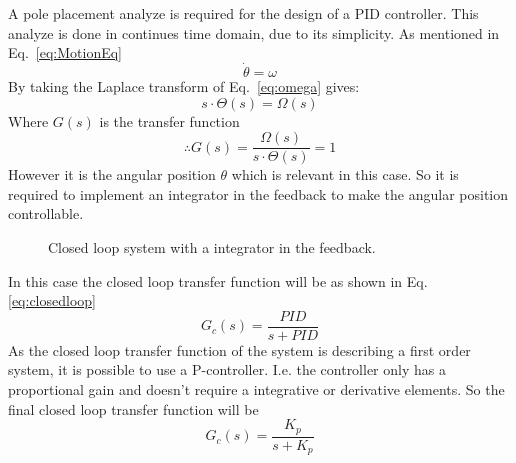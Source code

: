 A pole placement analyze is required for the design of a PID controller.
This analyze is done in continues time domain, due to its simplicity.
As mentioned in Eq.~\eqref{eq:MotionEq}
\begin{equation}
\dot{\theta} = \omega
\label{eq:omega}
\end{equation}
By taking the Laplace transform of Eq.~\eqref{eq:omega} gives:
\begin{equation}
s\cdot \Theta(s)= \Omega(s)
\end{equation}
Where $G(s)$ is the transfer function
\begin{equation}
\therefore G(s)=\frac{\Omega(s)}{s\cdot\Theta(s)} = 1
\end{equation}
However it is the angular position $\theta$ which is relevant in this case.
So it is required to implement an integrator in the feedback to make the angular position controllable.
\begin{figure}[h]
    \begin{center}
    \end{center}
    \caption{Closed loop system with a integrator in the feedback.}\label{fig:closedloop}
\end{figure}

In this case the closed loop transfer function will be as shown in Eq.\eqref{eq:closedloop}
\begin{equation}
G_{c}(s) = \frac{PID}{s + PID}
\label{eq:closedloop}
\end{equation} 
As the closed loop transfer function of the system is describing a first order system, it is possible to use a P-controller. 
I.e. the controller only has a proportional gain and doesn't require a integrative or derivative elements. 
So the final closed loop transfer function will be 
\begin{equation}
G_{c}(s) = \frac{K_p}{s + K_p}
\label{eq:kp}
\end{equation}

